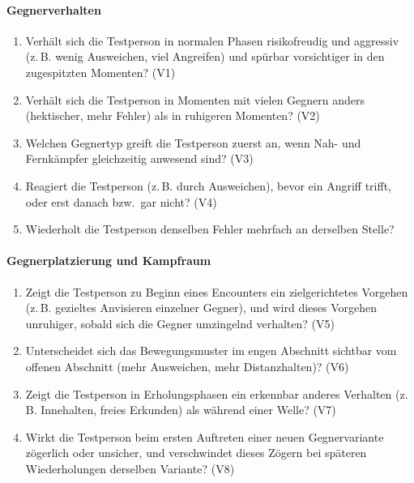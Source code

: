 \documentclass[../Main.tex]{subfiles}
\begin{document}
\paragraph{Gegnerverhalten}
\begin{enumerate}[label=\textbf{B\arabic*}, leftmargin=1.5cm, itemsep=0.5em]
    \item Verhält sich die Testperson in normalen Phasen risikofreudig und aggressiv (z.\,B. wenig Ausweichen, viel Angreifen) und spürbar vorsichtiger in den zugespitzten Momenten? \hfill (V1)
    \item Verhält sich die Testperson in Momenten mit vielen Gegnern anders (hektischer, mehr Fehler) als in ruhigeren Momenten? \hfill (V2)
    \item Welchen Gegnertyp greift die Testperson zuerst an, wenn Nah- und Fernkämpfer gleichzeitig anwesend sind? \hfill (V3)
    \item Reagiert die Testperson (z.\,B. durch Ausweichen), bevor ein Angriff trifft, oder erst danach bzw.\ gar nicht? \hfill (V4)
    \item Wiederholt die Testperson denselben Fehler mehrfach an derselben Stelle?
\end{enumerate}

\paragraph{Gegnerplatzierung und Kampfraum}
\begin{enumerate}[label=\textbf{B\arabic*}, leftmargin=1.5cm, itemsep=0.5em, resume]
    \item Zeigt die Testperson zu Beginn eines Encounters ein zielgerichtetes Vorgehen (z.\,B. gezieltes Anvisieren einzelner Gegner), und wird dieses Vorgehen unruhiger, sobald sich die Gegner umzingelnd verhalten? \hfill (V5)
    \item Unterscheidet sich das Bewegungsmuster im engen Abschnitt sichtbar vom offenen Abschnitt (mehr Ausweichen, mehr Distanzhalten)? \hfill (V6)
    \item Zeigt die Testperson in Erholungsphasen ein erkennbar anderes Verhalten (z.\,B. Innehalten, freies Erkunden) als während einer Welle? \hfill (V7)
    \item Wirkt die Testperson beim ersten Auftreten einer neuen Gegnervariante zögerlich oder unsicher, und verschwindet dieses Zögern bei späteren Wiederholungen derselben Variante? \hfill (V8)
\end{enumerate}
\end{document}
